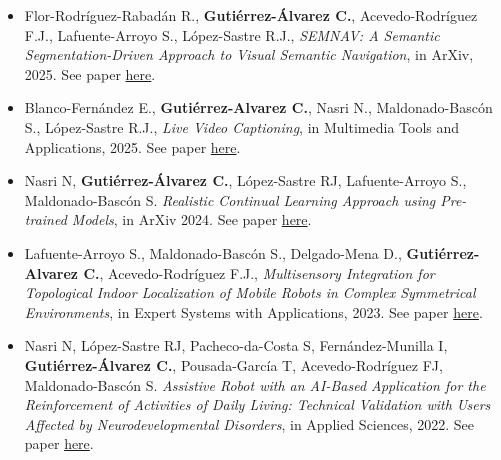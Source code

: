 \begin{itemize}
    \item Flor-Rodríguez-Rabadán R., \textbf{Gutiérrez-Álvarez C.}, Acevedo-Rodríguez F.J., Lafuente-Arroyo S., López-Sastre R.J., \textit{SEMNAV: A Semantic Segmentation-Driven Approach to Visual Semantic Navigation}, in ArXiv, 2025.
    See paper \href{https://arxiv.org/abs/2506.01418}{here}.
    \item Blanco-Fernández E., \textbf{Gutiérrez-Alvarez C.}, Nasri N., Maldonado-Bascón S., López-Sastre R.J., \textit{Live Video Captioning}, in Multimedia Tools and Applications, 2025.
    See paper \href{https://link.springer.com/article/10.1007/s11042-025-20908-w}{here}.
    \item Nasri N, \textbf{Gutiérrez-Álvarez C.}, López-Sastre RJ, Lafuente-Arroyo S., Maldonado-Bascón S. \textit{Realistic Continual Learning Approach using Pre-trained Models}, in ArXiv 2024.
    See paper \href{https://arxiv.org/abs/2404.07729}{here}.
    \item Lafuente-Arroyo S., Maldonado-Bascón S., Delgado-Mena D., \textbf{Gutiérrez-Alvarez C.}, Acevedo-Rodríguez F.J., \textit{Multisensory Integration for Topological Indoor Localization of Mobile Robots in Complex Symmetrical Environments}, in Expert Systems with Applications, 2023.
    See paper \href{https://www.sciencedirect.com/science/article/pii/S0957417423030634}{here}.
    \item Nasri N, López-Sastre RJ, Pacheco-da-Costa S, Fernández-Munilla I, \textbf{Gutiérrez-Álvarez C.}, Pousada-García T, Acevedo-Rodríguez FJ, Maldonado-Bascón S. \textit{Assistive Robot with an AI-Based Application for the Reinforcement of Activities of Daily Living: Technical Validation with Users Affected by Neurodevelopmental Disorders}, in Applied Sciences, 2022.
    See paper \href{https://www.mdpi.com/2076-3417/12/19/9566}{here}.
\end{itemize}
